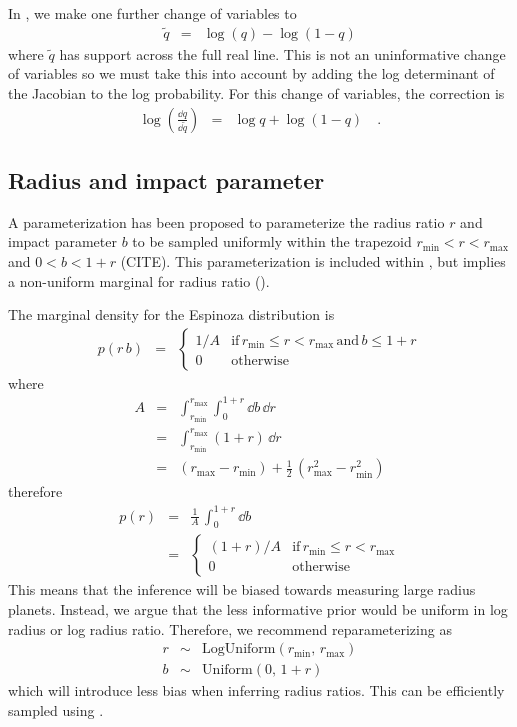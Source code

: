 \documentclass[modern]{aastex62}
\begin{document}
In \exoplanet, we make one further change of variables to
\begin{eqnarray}
\tilde{q} &=& \log(q) - \log(1-q)
\end{eqnarray}
where $\tilde{q}$ has support across the full real line.
This is not an uninformative change of variables so we must take this into account by adding the log determinant of the Jacobian to the log probability.
For this change of variables, the correction is
\begin{eqnarray}
\log\left(\frac{\dd q}{\dd\tilde{q}}\right) &=& \log q + \log(1 - q) \quad.
\end{eqnarray}

\subsection{Radius and impact parameter}

A parameterization has been proposed to parameterize the radius ratio $r$ and impact parameter $b$ to be sampled uniformly within the trapezoid $r_\mathrm{min} < r < r_\mathrm{max}$ and $0 < b < 1 + r$ (CITE).
This parameterization is included within \exoplanet, but implies a non-uniform marginal for radius ratio ().

The marginal density for the Espinoza distribution is
\begin{eqnarray}
p(r\,b) &=& \left\{\begin{array}{ll}
1/A & \mathrm{if}\,r_\mathrm{min} \le r < r_\mathrm{max}\,\mathrm{and}\,b\le 1+r\\
0 & \mathrm{otherwise}
\end{array} \right.
\end{eqnarray}
where
\begin{eqnarray}
A &=& \int_{r_\mathrm{min}}^{r_\mathrm{max}} \int_{0}^{1+r}\dd b\,\dd r \\
&=& \int_{r_\mathrm{min}}^{r_\mathrm{max}} (1 + r)\,\dd r\\
&=& (r_\mathrm{max} - r_\mathrm{min}) + \frac{1}{2}\,(r_\mathrm{max}^2 - r_\mathrm{min}^2)
\end{eqnarray}
therefore
\begin{eqnarray}
p(r) &=& \frac{1}{A}\,\int_{0}^{1+r}\dd b \\
&=& \left\{\begin{array}{ll}
  (1+r)/A & \mathrm{if}\,r_\mathrm{min} \le r < r_\mathrm{max} \\
  0 & \mathrm{otherwise}
\end{array}\right.
\end{eqnarray}
This means that the inference will be biased towards measuring large radius planets.
Instead, we argue that the less informative prior would be uniform in log radius or log radius ratio.
Therefore, we recommend reparameterizing as
\begin{eqnarray}
r &\sim& \mathrm{LogUniform}(r_\mathrm{min},\,r_\mathrm{max}) \\
b &\sim& \mathrm{Uniform}(0,\,1+r)
\end{eqnarray}
which will introduce less bias when inferring radius ratios.
This can be efficiently sampled using \exoplanet.
\end{document}
